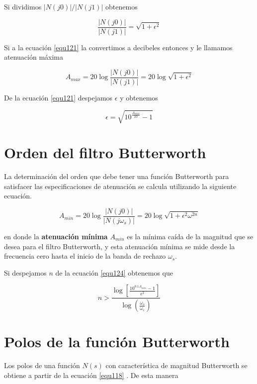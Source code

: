 \documentclass[12pt]{book}
\theoremstyle{definition}
\theoremstyle{remark}
\theoremstyle{plain}
\begin{document}
Si dividimos $|N(j0)|/|N(j1)|$ obtenemos

\begin{equation}
\frac{|N(j0)|}{|N(j1)|}= \sqrt{1+\epsilon ^2}
\label{equ121}
\end{equation}

Si a la ecuación \ref{equ121} la convertimos a decibeles entonces y le llamamos atenuación máxima 

\begin{equation}
A_{max}=20 \log \frac{|N(j0)|}{|N(j1)|}= 20 \log  \sqrt{1+\epsilon ^2}
\label{eq122}
\end{equation}

 De la ecuación \ref{equ121} despejamos $\epsilon$ y obtenemos

\begin{equation}
\epsilon = \sqrt{10 ^{\frac{A_{max}}{10}}-1}
\label{equ123}
\end{equation}

\section{Orden del filtro Butterworth}
La determinación del orden que debe tener una función Butterworth para satisfacer las especificaciones de atenuación se calcula utilizando la siguiente ecuación.

\begin{equation}
A_{min}= 20 \log \frac{|N(j0)|}{|N(j\omega _s)|}= 20 \log \sqrt{1+\epsilon ^2 \omega ^{2 n}}
\label{equ124}
\end{equation}

en donde la \textbf{atenuación mínima} $A_{min}$ es la mínima caída de la magnitud que se desea para el filtro Butterworth, y esta atenuación mínima se mide desde la frecuencia cero hasta el inicio de la banda de rechazo $\omega _s$.

Si despejamos $n$ de la ecuación \ref{equ124} obtenemos que

\begin{equation}
n > \frac{\log [\frac{10^{0.1 A_{min}}-1}{\epsilon ^2}]}{\log (\frac{\omega _s}{\omega _c})}
\label{equ125}
\end{equation}

\section{Polos de la función Butterworth}

Los polos de una función $N(s)$ con característica de magnitud Butterworth se obtiene a partir de la ecuación \ref{equ118} . De esta manera
\end{document}
